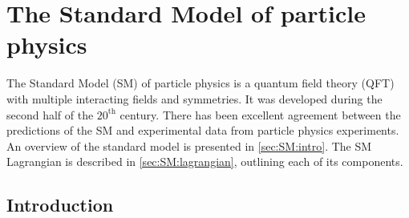 \def \vacr {{\lvert\mkern1.5mu0\mkern1.5mu\rangle}}
\def \vacl {{\langle\mkern1.5mu0\mkern1.5mu\rvert}}

\chapter{The Standard Model of particle physics}\label{chap:SM}



The Standard Model (SM) of particle physics is a quantum field theory (QFT) with multiple interacting fields and symmetries. It was developed during the second half of the $20^{\mathrm{th}}$ century. There has been excellent agreement between the predictions of the SM and experimental data from particle physics experiments. An overview of the standard model is presented in \cref{sec:SM:intro}. The SM Lagrangian is described in \cref{sec:SM:lagrangian}, outlining each of its components.

\section{Introduction}
